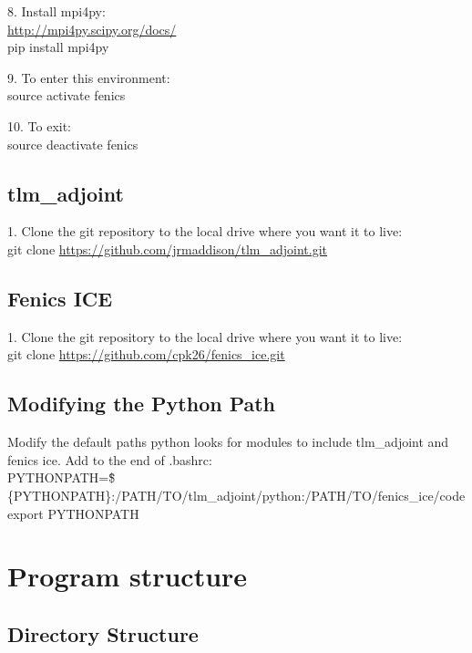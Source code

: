 \documentclass[11pt, reqno, nocenter]{article}
\begin{document}
8. Install mpi4py: \\
\url{http://mpi4py.scipy.org/docs/} \\
pip install mpi4py

9. To enter this environment: \\
source activate fenics

10. To exit: \\
source deactivate fenics

\subsection{tlm\_adjoint}

1. Clone the git repository to the local drive where you want it to live:\\
git clone \url{https://github.com/jrmaddison/tlm_adjoint.git}

\subsection{Fenics ICE}

1. Clone the git repository to the local drive where you want it to live: \\
git clone \url{https://github.com/cpk26/fenics_ice.git}

\subsection{Modifying the Python Path}

Modify the default paths python looks for modules to include tlm\_adjoint and fenics ice. Add to the end of .bashrc: \\
PYTHONPATH=\"\$\{PYTHONPATH\}:/PATH/TO/tlm\_adjoint/python:/PATH/TO/fenics\_ice/code\" \\
export PYTHONPATH

\section{Program structure}

\subsection{Directory Structure}
\end{document}
